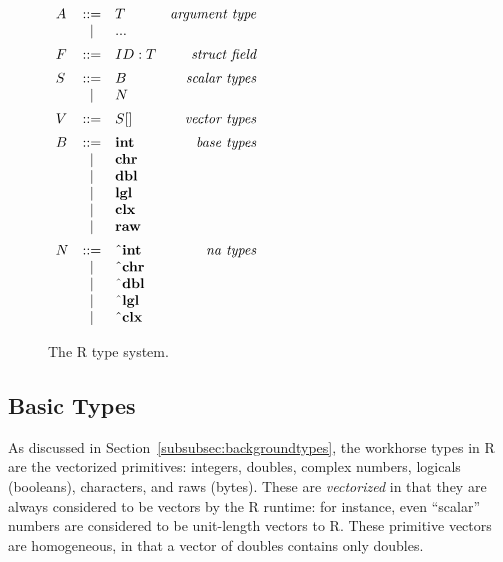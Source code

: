 \documentclass[acmsmall,review,anonymous]{acmart}\settopmatter{printfolios=true,printccs=false,printacmref=false}
\begin{document}
\begin{figure}
\begin{minipage}{.45\linewidth}
    \begin{flushright}
    $ \begin{array}{lclr}
    A & ::= & T & \text{\it argument type} \\
      & |   & {\bf ...} \vspace{5pt} \\
    F & ::= & ID : T & \text{\it struct field}\vspace{5pt}\\
    S & ::= & B & \text{\it scalar types} \\
      & |   & N \vspace{5pt}\\
    V & ::= & S \lbrack \rbrack & \text{\it vector types} \vspace{5pt}\\
    B & ::= & {\bf int} & \text{\it base types} \\
      & |   & {\bf chr} \\
      & |   & {\bf dbl} \\
      & |   & {\bf lgl} \\
      & |   & {\bf clx} \\
      & |   & {\bf raw} \vspace{5pt}\\
    N & ::= & {\bf \string^int} & \text{\it na types} \\
      & |   & {\bf \string^chr} \\
      & |   & {\bf \string^dbl} \\
      & |   & {\bf \string^lgl} \\
      & |   & {\bf \string^clx} \\
\end{array} $
    \end{flushright}
    \end{minipage}
    \caption{The R type system.}
    \label{fig:types}
\end{figure}



%
%
%
%
\subsection{Basic Types}
\label{subsec:basictypes}

As discussed in Section~\ref{subsubsec:backgroundtypes}, the workhorse types in R are the vectorized primitives: integers, doubles, complex numbers, logicals (booleans), characters, and raws (bytes).
These are {\it vectorized} in that they are always considered to be vectors by the R runtime: for instance, even ``scalar'' numbers are considered to be unit-length vectors to R.
These primitive vectors are homogeneous, in that a vector of doubles contains only doubles.
\end{document}
